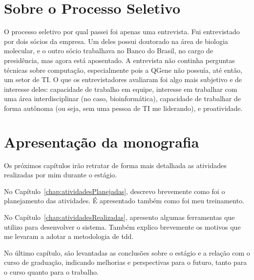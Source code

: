 

\section{Sobre o Processo Seletivo}
O processo seletivo por qual passei foi apenas uma entrevista. Fui entrevistado por dois sócios da empresa. Um deles
possui doutorado na área de biologia molecular, e o outro sócio trabalhava no Banco do Brasil, no cargo de presidência,
mas agora está aposentado. A entrevista não continha perguntas técnicas sobre computação, especialmente pois a QGene não
possuía, até então, um setor de TI. O que os entrevistadores avaliaram foi algo mais subjetivo e de interesse deles:
capacidade de trabalho em equipe, interesse em trabalhar com uma área interdisciplinar (no caso, bioinformática),
capacidade de trabalhar de forma autônoma (ou seja, sem uma pessoa de TI me liderando), e proatividade.


\section{Apresentação da monografia}

Os próximos capítulos irão retratar de forma mais detalhada as atividades realizadas por mim durante o estágio.

No Capítulo~\ref{chap:atividadesPlanejadas}, descrevo brevemente como foi o planejamento das atividades. É apresentado também
como foi meu treinamento.

No Capítulo~\ref{chap:atividadesRealizadas}, apresento algumas ferramentas que utilizo para desenvolver o sistema. Também explico brevemente os motivos
que me levaram a adotar a metodologia de \gls{tdd}.

No último capítulo, são levantadas as conclusões sobre o estágio e a relação com 
o curso de graduação, indicando melhorias e perspectivas para o futuro, tanto para o curso 
quanto para o trabalho.
